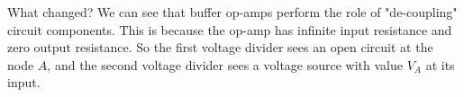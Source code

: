 
What changed? We can see that buffer op-amps perform the role of "de-coupling" circuit components. This is because the op-amp has infinite input resistance and zero output resistance. So the first voltage divider sees an open circuit at the node $A$, and the second voltage divider sees a voltage source with value $V_A$ at its input.